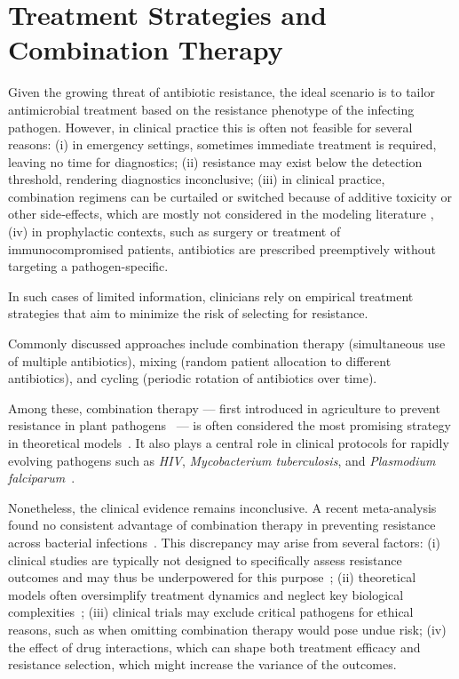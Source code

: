 \documentclass[../main.tex]{subfiles}
\begin{document}
\section{Treatment Strategies and Combination Therapy}
Given the growing threat of antibiotic resistance, the ideal scenario is to tailor antimicrobial treatment based on the resistance phenotype of the infecting pathogen. However, in clinical practice this is often not feasible for several reasons: (i) in emergency settings, sometimes immediate treatment is required, leaving no time for diagnostics; (ii) resistance may exist below the detection threshold, rendering diagnostics inconclusive; (iii) in clinical practice, combination regimens can be curtailed or switched because of additive toxicity or other side‑effects, which are mostly not considered in the modeling literature \cite{...}, (iv) in prophylactic contexts, such as surgery or treatment of immunocompromised patients, antibiotics are prescribed preemptively without targeting a pathogen-specific.

In such cases of limited information, clinicians rely on empirical treatment strategies that aim to minimize the risk of selecting for resistance.

Commonly discussed approaches include combination therapy (simultaneous use of multiple antibiotics), mixing (random patient allocation to different antibiotics), and cycling (periodic rotation of antibiotics over time).

Among these, combination therapy --- first introduced in agriculture to prevent resistance in plant pathogens~\cite{Kable1980, Delp1980, Skylakakis1981} --- is often considered the most promising strategy in theoretical models~\cite{Bonhoeffer1997, Tepekule2017,Uecker2021}.
It also plays a central role in clinical protocols for rapidly evolving pathogens such as \textit{HIV}, \textit{Mycobacterium tuberculosis}, and \textit{Plasmodium falciparum}~\cite{Goldberg2012}.

Nonetheless, the clinical evidence remains inconclusive.
A recent meta-analysis found no consistent advantage of combination therapy in preventing resistance across bacterial infections~\cite{siedentop_metaanalysis_2024}.
This discrepancy may arise from several factors: (i) clinical studies are typically not designed to specifically assess resistance outcomes and may thus be underpowered for this purpose~\cite{siedentop_metaanalysis_2024}; (ii) theoretical models often oversimplify treatment dynamics and neglect key biological complexities~\cite{Uecker2021}; (iii) clinical trials may exclude critical pathogens for ethical reasons, such as when omitting combination therapy would pose undue risk; (iv) the effect of drug interactions, which can shape both treatment efficacy and resistance selection, which might increase the variance of the outcomes.
\end{document}
